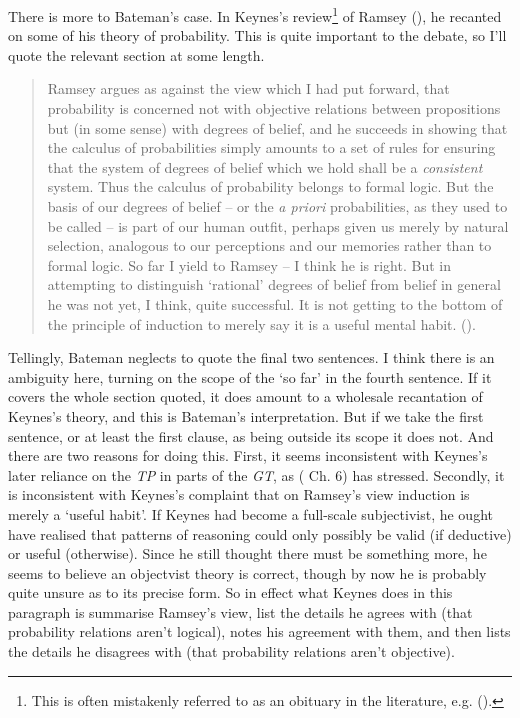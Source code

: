\documentclass[
  10pt,
  letterpaper,
  DIV=11,
  numbers=noendperiod,
  twoside]{scrartcl}
\begin{document}
There is more to Bateman's case. In Keynes's review\footnote{This is
  often mistakenly referred to as an obituary in the literature, e.g.
  ().} of Ramsey
(), he recanted on some of his theory of
probability. This is quite important to the debate, so I'll quote the
relevant section at some length.

\begin{quote}
Ramsey argues as against the view which I had put forward, that
probability is concerned not with objective relations between
propositions but (in some sense) with degrees of belief, and he succeeds
in showing that the calculus of probabilities simply amounts to a set of
rules for ensuring that the system of degrees of belief which we hold
shall be a \emph{consistent} system. Thus the calculus of probability
belongs to formal logic. But the basis of our degrees of belief -- or
the \emph{a priori} probabilities, as they used to be called -- is part
of our human outfit, perhaps given us merely by natural selection,
analogous to our perceptions and our memories rather than to formal
logic. So far I yield to Ramsey -- I think he is right. But in
attempting to distinguish `rational' degrees of belief from belief in
general he was not yet, I think, quite successful. It is not getting to
the bottom of the principle of induction to merely say it is a useful
mental habit. ().
\end{quote}

Tellingly, Bateman neglects to quote the final two sentences. I think
there is an ambiguity here, turning on the scope of the `so far' in the
fourth sentence. If it covers the whole section quoted, it does amount
to a wholesale recantation of Keynes's theory, and this is Bateman's
interpretation. But if we take the first sentence, or at least the first
clause, as being outside its scope it does not. And there are two
reasons for doing this. First, it seems inconsistent with Keynes's later
reliance on the \emph{TP} in parts of the \emph{GT}, as
( Ch. 6) has stressed.
Secondly, it is inconsistent with Keynes's complaint that on Ramsey's
view induction is merely a `useful habit'. If Keynes had become a
full-scale subjectivist, he ought have realised that patterns of
reasoning could only possibly be valid (if deductive) or useful
(otherwise). Since he still thought there must be something more, he
seems to believe an objectvist theory is correct, though by now he is
probably quite unsure as to its precise form. So in effect what Keynes
does in this paragraph is summarise Ramsey's view, list the details he
agrees with (that probability relations aren't logical), notes his
agreement with them, and then lists the details he disagrees with (that
probability relations aren't objective).
\end{document}
